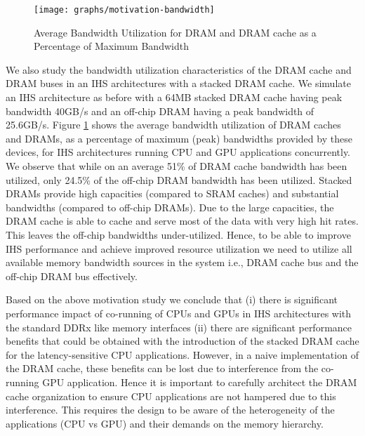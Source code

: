 \begin{figure}[htb]
	\centering

	\texttt{[image: graphs/motivation-bandwidth]}
	\caption{Average Bandwidth Utilization for DRAM and DRAM cache as a Percentage of Maximum Bandwidth}
	\label{fig:motivation-banwdidth}
\end{figure}

\par We also study the bandwidth utilization characteristics of the DRAM cache and DRAM buses in an IHS architectures with a stacked DRAM cache. We simulate an IHS architecture as before with a 64MB stacked DRAM cache having peak bandwidth 40GB/s and an off-chip DRAM having a peak bandwidth of 25.6GB/s. Figure \ref{fig:motivation-banwdidth} shows the average bandwidth utilization of DRAM caches and DRAMs, as a percentage of maximum (peak) bandwidths provided by these devices, for IHS architectures running CPU and GPU applications concurrently. We observe that while on an average 51\% of DRAM cache bandwidth has been utilized, only 24.5\% of the off-chip DRAM bandwidth has been utilized. Stacked DRAMs provide high capacities (compared to SRAM caches) and substantial bandwidths (compared to off-chip DRAMs). Due to the large capacities, the DRAM cache is able to cache and serve most of the data with very high hit rates. This leaves the off-chip bandwidths under-utilized. Hence, to be able to improve IHS performance and achieve improved resource utilization we need to utilize all available memory bandwidth sources in the system i.e., DRAM cache bus and the off-chip DRAM bus effectively.

\par Based on the above motivation study we conclude that (i) there is significant performance impact of co-running of CPUs and GPUs in IHS architectures with the standard DDRx like memory interfaces (ii) there are significant performance benefits that could be obtained 
with the introduction of the stacked DRAM cache for the latency-sensitive CPU applications. However, in a naive implementation
of the DRAM cache, these benefits can be lost due to interference from the co-running GPU application.  Hence it is important to carefully 
architect the DRAM cache organization to ensure CPU applications are not hampered due to this interference.
This requires the design to be aware of the heterogeneity of the applications (CPU vs GPU) and their demands on the 
memory hierarchy.  


